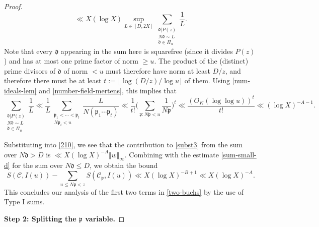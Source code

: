 \documentclass[11pt,reqno]{amsart}
\numberwithin{equation}{section}
\theoremstyle{definition}
\theoremstyle{remark}
\newcommand{\mc}{\mathcal}
\newcommand{\mf}{\mathfrak}
\renewcommand{\le}{\leqslant}
\renewcommand{\ge}{\geqslant}
\begin{document}
\begin{proof}
\begin{equation}\label{210}
\ll  X(\log X)\sup_{L\in [D,2X]}\sum_{\substack{\mf{d}|P(z)\\ N\mf{d}\sim L\\\mf{d}\in \Pi_u}} \frac{1}{L}.
\end{equation}
Note that every $\mf{d}$ appearing in the sum here is squarefree (since it divides $P(z)$) and has at most one prime factor of norm $\ge u$. The product of the (distinct) prime divisors of $\mf{d}$ of norm $< u$ must therefore have norm at least $D/z$, and therefore there must be at least $t := \lfloor \log(D/z)/\log u\rfloor$ of them. Using \cref{num-ideals-lem} and \cref{number-field-mertens}, this implies that 
\[
\sum_{\substack{\mf{d}|P(z)\\ N\mf{d}\sim L\\\mf{d}\in \Pi_u}} \frac{1}{L}  \ll \frac{1}{L} \sum_{ \substack{\mf{p}_1 < \cdots < \mf{p}_t \\ N\mf{p}_i < u}} \frac{L}{N (\mf{p}_1 \cdots \mf{p}_t)}  \ll \frac{1}{t!}\big(\sum_{\mf{p} : N\mf{p} < u}\frac{1}{N\mf{p}}\big)^t\ll \frac{(O_{K}(\log\log u))^t}{t!}\ll (\log X)^{-A-1}.
\]

Substituting into \cref{210}, we see that the contribution to \cref{subst3} from the sum over $N\mf{d} > D$ is $\ll X (\log X)^{-A}\Vert w \Vert_{\infty}$. Combining with the estimate \cref{sum-small-d} for the sum over $N\mf{d} \le D$, we obtain the bound
\begin{equation}\label{typei-portion}
S(\mc{C},I(u)) - \sum_{u \le  N\mf{p}<z}S(\mc{C}_{\mf{p}},I(u)) \ll X (\log X)^{-B + 1} \ll X (\log X)^{-A} .\end{equation}
This concludes our analysis of the first two terms in \eqref{two-buchs} by the use of Type I sums.\vspace*{8pt}

\textbf{Step 2: Splitting the $\mf{p}$ variable.}



\end{proof}
\end{document}
